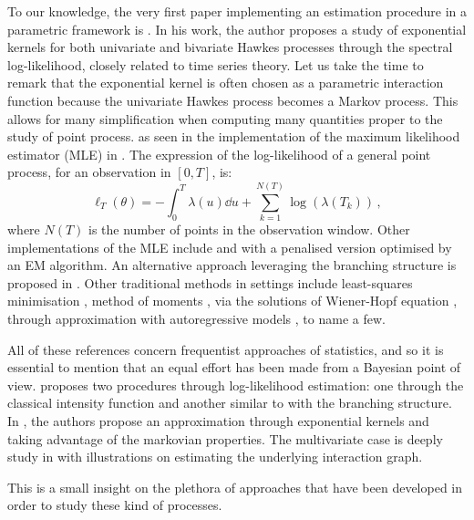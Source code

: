 
    To our knowledge, the very first paper implementing an estimation procedure in a parametric framework is \textcite{Adamopoulos1976}.
    In his work, the author proposes a study of exponential kernels for both univariate and bivariate Hawkes processes through the spectral log-likelihood,
    closely related to time series theory.
    Let us take the time to remark that the exponential kernel is often chosen as a parametric interaction function because the univariate Hawkes process becomes a Markov process.
    This allows for many simplification when computing many quantities proper to the study of point process.
    as seen in the implementation of the maximum likelihood estimator (MLE) in \textcite{Ozaki1979}.
    The expression of the log-likelihood of a general point process, for an observation in $[0, T]$, is:
    \begin{equation}\label{eq:chap0_loglikelihood}
      \ell_T(\theta) = - \int_{0}^{T}{\lambda(u)\dd u} + \sum_{k=1}^{N(T)}{\log(\lambda(T_k))}\,,
    \end{equation}
    where $N(T)$ is the number of points in the observation window. 
    Other implementations of the MLE include \textcite{Ogata1988, Guo2018} and \textcite{Lewis2011} with a penalised version optimised by an EM algorithm.
    An alternative approach leveraging the branching structure is proposed in \textcite{Veen2008}.
    Other traditional methods in settings include least-squares minimisation \parencite{Reynaud2010, Eichler2016, Kirchner2017}, 
    method of moments \parencite{DaFonseca2013},
    via the solutions of Wiener-Hopf equation \parencite{Bacry2016},
    through approximation with autoregressive models \parencite{Kirchner2017},
    to name a few.
    
    All of these references concern frequentist approaches of statistics, 
    and so it is essential to mention that an equal effort has been made from a Bayesian point of view.
    \textcite{Rasmussen2013} proposes two procedures through log-likelihood estimation: 
    one through the classical intensity function and another similar to \textcite{Veen2008} with the branching structure.
    In \textcite{Lemonnier2014}, the authors propose an approximation through exponential kernels and taking advantage of the markovian properties.
    The multivariate case is deeply study in \textcite{Donnet2020} with illustrations on estimating the underlying interaction graph.
    
    This is a small insight on the plethora of approaches that have been developed in order to study these kind of processes.
    
